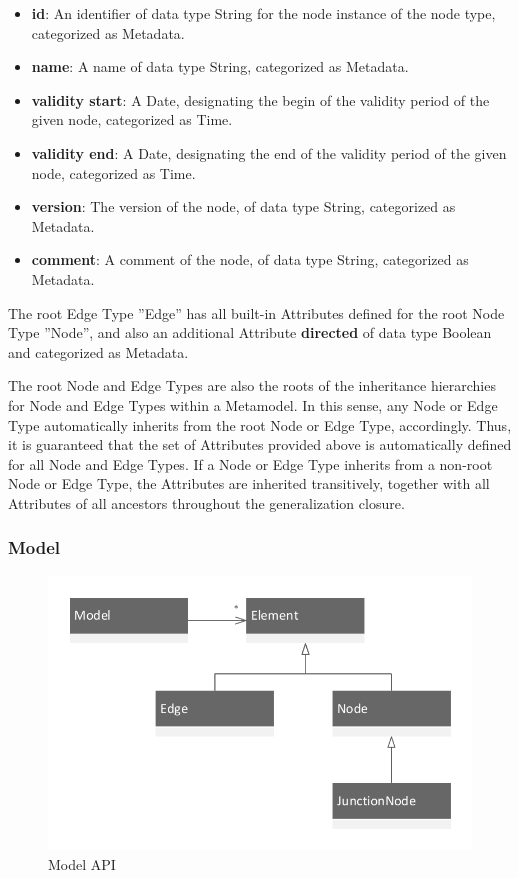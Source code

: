\begin{itemize}
\item \textbf{id}: An identifier of data type String for the node instance of the node type, categorized as Metadata.
\item \textbf{name}: A name of data type String, categorized as Metadata.
\item \textbf{validity start}: A Date, designating the begin of the validity period of the given node, categorized as Time.
\item \textbf{validity end}: A Date, designating the end of the validity period of the given node, categorized as Time.
\item \textbf{version}: The version of the node, of data type String, categorized as Metadata.
\item \textbf{comment}: A comment of the node, of data type String, categorized as Metadata.
\end{itemize}

The root Edge Type ''Edge'' has all built-in Attributes defined for the root Node Type ''Node'', and also an additional Attribute \textbf{directed} of data type Boolean and categorized as Metadata. 

The root Node and Edge Types are also the roots of the inheritance hierarchies for Node and Edge Types within a Metamodel. In this sense, any Node or Edge Type automatically inherits from the root Node or Edge Type, accordingly. Thus, it is guaranteed that the set of Attributes provided above is automatically defined for all Node and Edge Types. If a Node or Edge Type inherits from a non-root Node or Edge Type, the Attributes are inherited transitively, together with all Attributes of all ancestors throughout the generalization closure.

\subsubsection{Model}

\begin{figure}
\centering
\includegraphics[scale=0.75]{figures/model.pdf}
\caption{Model API}
\label{fig:model}
\end{figure}

